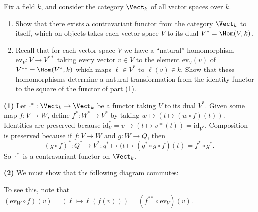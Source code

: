\begin{problem}
Fix a field $k$, and consider the category $\Vect_k$ of all vector spaces over $k$.
\begin{enumerate}
  \item Show that there exists a contravariant functor from the category $\Vect_k$ to itself, which on objects takes each vector space $V$ to its dual $V^*=\Hom(V,k)$.
  \item Recall that for each vector space $V$ we have a ``natural'' homomorphism $\mathrm{ev}_V:V\to V^{**}$ taking every vector $v\in V$ to the element $\mathrm{ev}_V(v)$ of $V^{**}=\Hom(V^*,k)$ which maps $\ell\in V^*$ to $\ell(v)\in k$. Show that these homomorphisms determine a natural transformation from the identity functor to the square of the functor of part (1).
\end{enumerate}
\end{problem}

\textbf{(1)} Let $\cdot^* : \Vect_k \to \Vect_k$ be a functor taking $V$ to its dual $V^*$. Given some map $f : V \to W$, define $f^* : W^* \to V^*$ by taking $w \mapsto (t \mapsto (w\circ f)(t))$. Identities are preserved because $\mathrm{id}_V^* = v \mapsto (t\mapsto v*(t)) = \mathrm{id}_{V^*}$. Composition is preserved because if $f : V \to W$ and $g : W \to Q$, then \[{(g\circ f)}^* : Q^* \to V^* : q^* \mapsto (t \mapsto (q^*\circ g\circ f)(t) = f^*\circ g^*.\] So $\cdot^*$ is a contravariant functor on $\Vect_k$. 

\textbf{(2)} We must show that the following diagram commutes:
\begin{center}
\end{center}
To see this, note that $(\mathrm{ev}_W\circ f)(v)=(\ell \mapsto \ell(f(v)))=(f^{**}\circ\mathrm{ev}_V)(v)$.